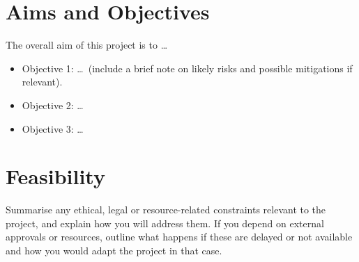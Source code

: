\documentclass[sans,oneside,single,parskip,raggedright,numeric]{qproposal}
\begin{document}
\section{Aims and Objectives}

The overall aim of this project is to \ldots

\begin{itemize}
  \item Objective 1: \ldots\ (include a brief note on likely risks and possible
    mitigations if relevant).
  \item Objective 2: \ldots
  \item Objective 3: \ldots
\end{itemize}

%
%

\section{Feasibility}

Summarise any ethical, legal or resource-related constraints relevant to
the project, and explain how you will address them. If you depend on external
approvals or resources, outline what happens if these are delayed or not
available and how you would adapt the project in that case.

%
%
\end{document}
